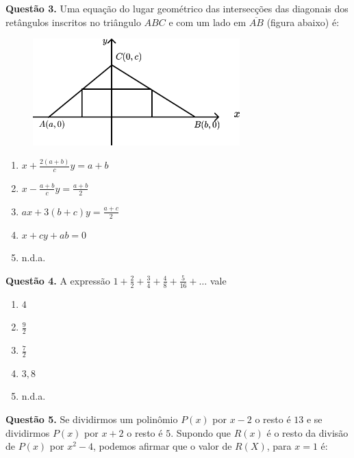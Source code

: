 \documentclass[11pt]{article}
\begin{document}
\textbf{Questão 3.} Uma equação do lugar geométrico das intersecções das diagonais dos retângulos inscritos no triângulo $ABC$ e com um lado em $\overline{AB}$ (figura abaixo) é:

\begin{figure}[h]
    \includegraphics[width=8cm]{./imgs/teste_png.png}
    \centering
\end{figure}

\begin{enumerate}[\bf A (\quad)]
	\item $\displaystyle x + \frac{2(a+b)}{c}y = a + b$
	\item $\displaystyle x - \frac{a+b}{c}y = \frac{a + b}{2}$
	\item $\displaystyle ax + 3(b + c)y = \frac{a + c}{2}$
    \item $x + cy + ab = 0$
    \item n.d.a.
\end{enumerate}

\newpage

\textbf{Questão 4.} A expressão $\displaystyle 1 + \frac{2}{2} + \frac{3}{4} + \frac{4}{8} + \frac{5}{16} + \dots$ vale

\begin{multicols}{5}
    \begin{enumerate}[\bf A (\quad)]
        \item $\displaystyle 4$
        \item $\displaystyle \frac{9}{2}$
        \item $\displaystyle \frac{7}{2}$
        \item $\displaystyle 3,8$
        \item n.d.a.
    \end{enumerate}
\end{multicols}

\textbf{Questão 5.} Se dividirmos um polinômio $P(x)$ por $x-2$ o resto é $13$ e se dividirmos $P(x)$ por $x + 2$ o resto é $5$. Supondo que $R(x)$ é o resto da divisão de $P(x)$ por $x^2 - 4$, podemos afirmar que o valor de $R(X)$, para $x = 1$ é:
 
\end{document}
